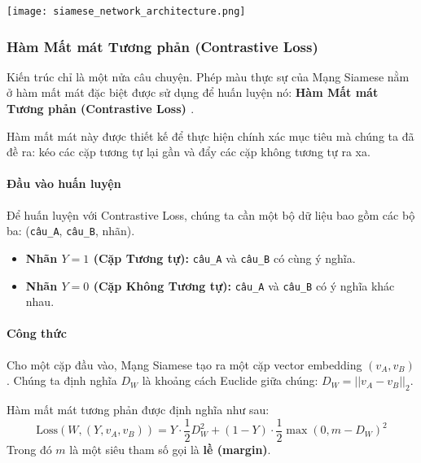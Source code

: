 \begin{center}
    \texttt{[image: siamese\_network\_architecture.png]}
    \label{fig:siamese_network_architecture}
\end{center}

\subsubsection{Hàm Mất mát Tương phản (Contrastive Loss)}
\label{ssec:contrastive_loss}
Kiến trúc chỉ là một nửa câu chuyện. Phép màu thực sự của Mạng Siamese nằm ở hàm mất mát đặc biệt được sử dụng để huấn luyện nó: \textbf{Hàm Mất mát Tương phản (Contrastive Loss) \cite{hadsell2006dimensionality}}.

Hàm mất mát này được thiết kế để thực hiện chính xác mục tiêu mà chúng ta đã đề ra: kéo các cặp tương tự lại gần và đẩy các cặp không tương tự ra xa.

\paragraph{Đầu vào huấn luyện}
Để huấn luyện với Contrastive Loss, chúng ta cần một bộ dữ liệu bao gồm các bộ ba: (\texttt{câu\_A}, \texttt{câu\_B}, nhãn).
\begin{itemize}
    \item \textbf{Nhãn $Y=1$ (Cặp Tương tự):} \texttt{câu\_A} và \texttt{câu\_B} có cùng ý nghĩa.
    \item \textbf{Nhãn $Y=0$ (Cặp Không Tương tự):} \texttt{câu\_A} và \texttt{câu\_B} có ý nghĩa khác nhau.
\end{itemize}


\paragraph{Công thức}
Cho một cặp đầu vào, Mạng Siamese tạo ra một cặp vector embedding $(v_A, v_B)$. Chúng ta định nghĩa $D_W$ là khoảng cách Euclide giữa chúng: $D_W = ||v_A - v_B||_2$.

Hàm mất mát tương phản được định nghĩa như sau:
\begin{equation}
    \text{Loss}(W, (Y, v_A, v_B)) = Y \cdot \frac{1}{2} D_W^2 + (1-Y) \cdot \frac{1}{2} \max(0, m - D_W)^2
    \label{eq:contrastive_loss}
\end{equation}
Trong đó $m$ là một siêu tham số gọi là \textbf{lề (margin)}.

